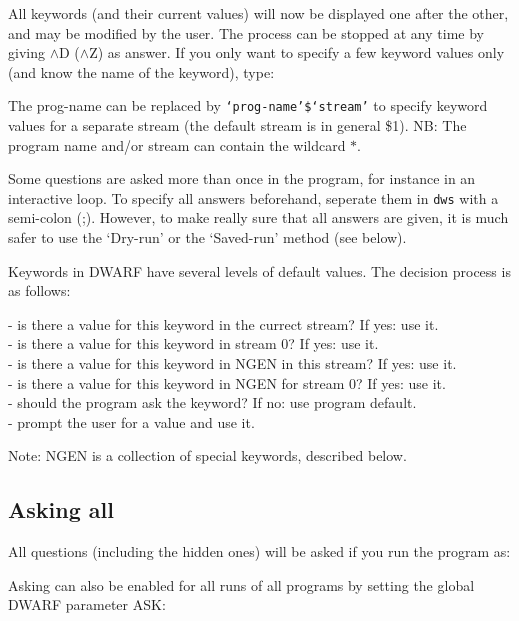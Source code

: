 All keywords (and their current values) will now be displayed one after the
other, and may be modified by the user.
The process can be stopped at any time by giving $\wedge$D ($\wedge$Z) as
answer. If you only want to specify a few keyword values only
(and know the name of the keyword), type: 

\sline{:}

The prog-name can be replaced  by {\tt `prog-name'\$`stream'} to
specify keyword values for a separate stream (the default stream is in
general \$1).
NB: The program name and/or stream can contain the wildcard $\ast$. 

Some questions are asked more than once in the program, for instance in
an interactive loop. 
To specify all answers beforehand, seperate them in {\tt dws} with a 
semi-colon (;).
However, to make really sure that all answers are given, it is much safer to
use the `Dry-run' or the `Saved-run' method (see below). 

Keywords in DWARF have several levels of default values. The decision 
process is as follows:

- is there a value for this keyword in the currect stream? If yes: use it.
\\- is there a value for this keyword in stream 0? If yes: use it.
\\- is there a value for this keyword in NGEN in this stream? If yes: use it.
\\- is there a value for this keyword in NGEN for stream 0? If yes: use it.
\\- should the program ask the keyword? If no: use program default.
\\- prompt the user for a value and use it.

Note: NGEN is a collection of special \NEWSTAR keywords, described below.

\subsection{Asking all}
\label{common.descr.dwarf-ask}

All questions (including the hidden ones) will be asked if you run the program
as:


Asking can also be enabled for all runs of all programs by setting
the global DWARF parameter ASK:

